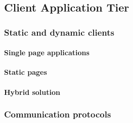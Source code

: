 

\subsection{Client Application Tier}

\subsubsection{Static and dynamic clients}

\paragraph*{Single page applications}

\paragraph*{Static pages}

\paragraph*{Hybrid solution}

\subsubsection{Communication protocols}



